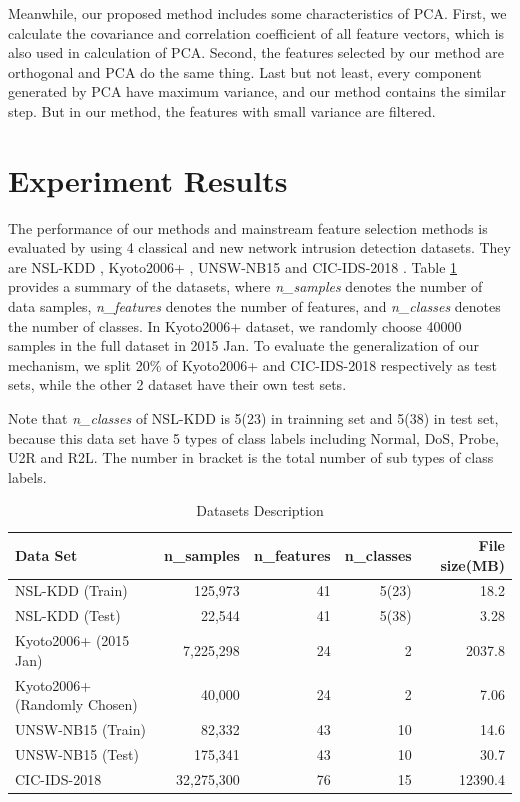 \documentclass{ieeeaccess}
\theoremstyle{definition}
\begin{document}
Meanwhile, our proposed method includes some characteristics of PCA. First, we calculate the covariance and correlation coefficient of all feature vectors, which is also used in calculation of PCA. Second, the features selected by our method are orthogonal and PCA do the same thing. Last but not least, every component generated by PCA have maximum variance, and our method contains the similar step. But in our method, the features with small variance are filtered.

\section{Experiment Results}
\label{sec:experiments}

The performance of our methods and mainstream feature selection methods is evaluated by using 4 classical and new network intrusion detection datasets. They are NSL-KDD \cite{nsl-kdd}, Kyoto2006+ \cite{kyoto2006}, UNSW-NB15 \cite{UNSWNB2015} and CIC-IDS-2018 \cite{CIC-IDS-2018}. 
Table \ref{tab:datasets} provides a summary of the datasets, where \emph{n\_samples} denotes the number of data samples, \emph{n\_features} denotes the number of features, and \emph{n\_classes} denotes the number of classes. 
In Kyoto2006+ dataset, we randomly choose 40000 samples in the full dataset in 2015 Jan. 
To evaluate the generalization of our mechanism, we split 20\% of Kyoto2006+ and CIC-IDS-2018 respectively as test sets, while the other 2 dataset have their own test sets.

Note that \emph{n\_classes} of NSL-KDD is 5(23) in trainning set and 5(38) in test set, because this data set have 5 types of class labels including Normal, DoS, Probe, U2R and R2L. The number in bracket is the total number of sub types of class labels.

\begin{table}[!htbp]
    \centering
    \caption{Datasets Description}
        \begin{tabular}{lrrrr}
        \toprule
        Data Set                    & n\_samples & n\_features & n\_classes & File size(MB) \\
        \midrule
        NSL-KDD\cite{nsl-kdd} (Train)            & 125,973    & 41    & 5(23) & 18.2      \\
        NSL-KDD (Test)                           & 22,544     & 41    & 5(38) & 3.28      \\
        Kyoto2006+\cite{kyoto2006} (2015 Jan)    & 7,225,298   & 24    & 2     & 2037.8    \\
        Kyoto2006+ (Randomly Chosen)             & 40,000     & 24    & 2     & 7.06      \\
        UNSW-NB15\cite{UNSWNB2015} (Train)       & 82,332     & 43    & 10    & 14.6      \\
        UNSW-NB15 (Test)                         & 175,341    & 43    & 10    & 30.7      \\
        CIC-IDS-2018\cite{CIC-IDS-2018}         & 32,275,300  & 76    & 15    & 12390.4   \\
        \bottomrule
        \end{tabular}%
    \label{tab:datasets}%
\end{table}%
\end{document}
